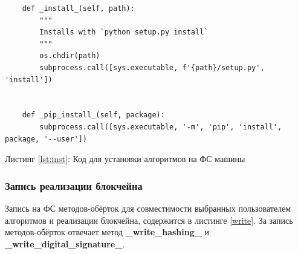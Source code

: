 \begin{center}
\begin{lstlisting}
    def _install_(self, path):
        """
        Installs with `python setup.py install`
        """
        os.chdir(path)
        subprocess.call([sys.executable, f'{path}/setup.py', 'install'])


    def _pip_install_(self, package):
        subprocess.call([sys.executable, '-m', 'pip', 'install', package, '--user'])
\end{lstlisting}\label{lst:inst}
Листинг \ref{lst:inst}: Код для установки алгоритмов на ФС машины
\end{center}


\subsubsection{Запись реализации блокчейна}

Запись на ФС методов-обёрток для совместимости выбранных пользователем
алгоритмов и реализации блокчейна, содержится в листинге \ref{write}. За запись
методов-обёрток отвечает метод \textbf{\_write\_hashing\_} и
\textbf{\_write\_digital\_signature\_}.


